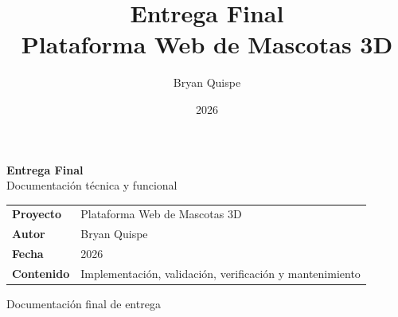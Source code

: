 \documentclass[12pt,a4paper]{article}
\title{\Huge\textbf{Entrega Final}\\[0.3em]\Large Plataforma Web de Mascotas 3D}
\author{Bryan Quispe}
\date{2026}
\begin{document}
\begin{titlepage}
\centering
\vspace*{1.8cm}
{\Huge\bfseries\color{PrimaryBlue} Entrega Final\\[0.35em]}
{\LARGE Documentaci\'on t\'ecnica y funcional\\[1.2cm]}

\begin{tabular}{p{5cm} p{8cm}}
\rowcolor{SoftGray}
\textbf{Proyecto} & Plataforma Web de Mascotas 3D \\
\textbf{Autor} & Bryan Quispe \\
\textbf{Fecha} & 2026 \\
\textbf{Contenido} & Implementaci\'on, validaci\'on, verificaci\'on y mantenimiento \\
\end{tabular}

\vfill
{\large Documentaci\'on final de entrega}
\end{titlepage}

\tableofcontents
\newpage





\end{document}

